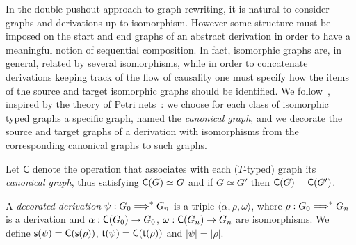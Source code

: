 In the double pushout approach to graph rewriting, it is natural to
consider graphs and derivations up to isomorphism.
%
However some structure must be imposed on the start and end graphs
of an abstract derivation in order to have a meaningful notion of
sequential composition.
%
In fact, isomorphic graphs are, in general, related by several
isomorphisms, while in order to concatenate derivations keeping track
of the flow of causality one must specify how the items of the source
and target isomorphic graphs should be identified.
%
We follow~\cite{Handbook}, inspired by the theory of
Petri nets~\cite{DMM:AANCP}: we choose for each class of isomorphic
typed graphs a specific graph, named the \emph{canonical graph}, and we
decorate the source and target graphs of a derivation with
isomorphisms from the corresponding canonical graphs to such
graphs.



Let $\mathsf{C}$ denote the operation that associates with each ($T$-typed)
graph its \emph{canonical graph}, thus satisfying $\mathsf{C}({G}) \simeq G$
and if $G \simeq G'$ then $\mathsf{C}({G}) = \mathsf{C}({G'})$.
%

\begin{definition}
  A \emph{decorated derivation} $\psi : G_0 \stackrel{{}}{\Longrightarrow}^* G_n$ is a
  triple $\langle \alpha, \rho, \omega \rangle$, where $\rho : G_0 \stackrel{{}}{\Longrightarrow}^*
  G_n$ is a derivation and $\alpha: \mathsf{C}({G_0}) \to G_0$, $\omega: \mathsf{C}({G_n}) \to
  G_n$ are isomorphisms. 
  We define $\mathsf{s}({\psi}) = \mathsf{C}({\mathsf{s}({\rho})})$, $\mathsf{t}({\psi}) =
  \mathsf{C}({\mathsf{t}({\rho})})$ and $|\psi| =|\rho|$.
\end{definition}


